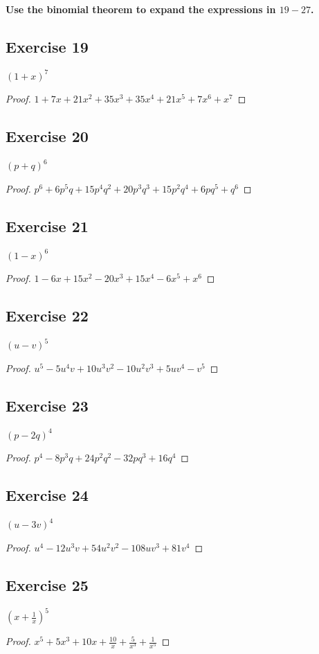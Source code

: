 \documentclass[14pt]{extarticle}
\newcommand{\cy}{\color{cyan}}
\begin{document}
{\bf \cy Use the binomial theorem to expand the expressions in \(19-27\).}

\subsection{Exercise 19}
\((1+x)^7\)
\begin{proof}
\(1 + 7x + 21x^2 + 35x^3 + 35x^4 + 21x^5 + 7x^6 + x^7\)
\end{proof}

\subsection{Exercise 20}
\((p+q)^6\)
\begin{proof}
\(p^6 + 6p^5q + 15p^4q^2 + 20p^3q^3 + 15p^2q^4 + 6pq^5 + q^6\)
\end{proof}

\subsection{Exercise 21}
\((1-x)^6\)
\begin{proof}
\(1 - 6x + 15x^2 - 20x^3 + 15x^4 - 6x^5 + x^6\)
\end{proof}

\subsection{Exercise 22}
\((u-v)^5\)
\begin{proof}
\(u^5 -5u^4v +10u^3v^2 -10u^2v^3 +5uv^4 -v^5\)
\end{proof}

\subsection{Exercise 23}
\((p-2q)^4\)
\begin{proof}
\(p^4 - 8p^3q + 24p^2q^2 - 32pq^3 + 16q^4\)
\end{proof}

\subsection{Exercise 24}
\((u-3v)^4\)
\begin{proof}
\(u^4 - 12u^3v + 54u^2v^2 - 108uv^3 + 81v^4\)
\end{proof}

\subsection{Exercise 25}
\(\left(x+\frac{1}{x}\right)^5\)
\begin{proof}
\(x^5 + 5x^3 + 10x + \frac{10}{x} + \frac{5}{x^3} + \frac{1}{x^5}\)
\end{proof}
\end{document}
